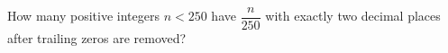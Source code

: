 How many positive integers $n<250$ have $\dfrac{n}{250}$ with exactly two decimal places after trailing zeros are removed?
